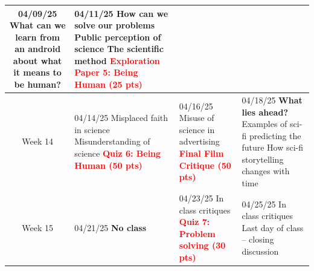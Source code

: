\documentclass[11pt]{article}
\begin{document}
\begin{tabularx}{\textwidth}{|c|X|X|X|}
    04/09/25 \newline\newline
    What can we learn from an android \newline
    about what it means to be human?\newline
     &
    

    04/11/25 \newline
    \textbf{How can we solve our problems}\newline
    Public perception of science \newline
    The scientific method\newline
    \textcolor{red}{\textbf{Exploration Paper 5: Being Human (25 pts)}}\\

    \hline
    Week 14 & 
    04/14/25 \newline\newline
    Misplaced faith in science \newline
    Misunderstanding of science\newline
    \textcolor{red}{\textbf{Quiz 6: Being Human (50 pts)}}&
    
    04/16/25 \newline\newline
    Misuse of science in advertising \newline 
    \textcolor{red}{\textbf{Final Film Critique (50 pts)}} &
    

    04/18/25 \newline
    \newline
    \textbf{What lies ahead?} \newline
    Examples of sci-fi predicting the future \newline
    How sci-fi storytelling changes with time \\


    \hline
    Week 15 & 
    
    \cellcolor{gray!20}04/21/25 \newline\newline
    \textbf{No class} \newline\newline &
    
    04/23/25 \newline
    \newline
    In class critiques \newline\newline
    \textcolor{red}{\textbf{Quiz 7: Problem solving (30 pts)}}
    &


    04/25/25 \newline
    \newline
    In class critiques\newline
    Last day of class -- closing discussion \\
    \hline
\end{tabularx}
\end{document}
